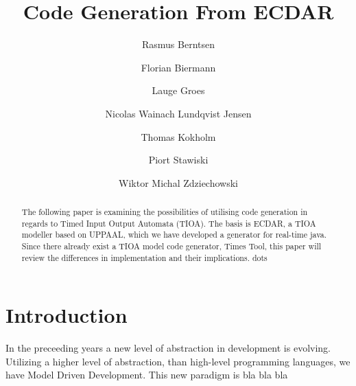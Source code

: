 \documentclass{llncs}
\begin{document}
%
\frontmatter          %
\pagestyle{headings}  %
%
\mainmatter              %
%
\title{Code Generation From ECDAR}
%
%
\author{Rasmus Berntsen \and Florian Biermann \and Lauge Groes \and Nicolas Wainach Lundqvist Jensen \and Thomas Kokholm \and Piort Stawiski \and Wiktor Michal Zdziechowski}
%
%
%
\maketitle %

\begin{abstract}
The following paper is examining the possibilities of utilising code generation in regards to Timed Input Output Automata (TIOA). The basis is ECDAR, a TIOA modeller based on UPPAAL, which we have developed a generator for real-time java. Since there already exist a TIOA model code generator, Times Tool, this paper will review the differences in implementation and their implications.
dots
\end{abstract}
%

\section{Introduction\label{introduction}}
%
In the preceeding years a new level of abstraction in development is evolving. Utilizing a higher level of abstraction, than high-level programming languages, we have Model Driven Development. This new paradigm is bla bla bla
\end{document}

